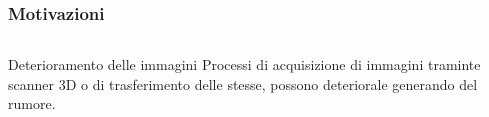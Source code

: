 \begin{frame}
  \frametitle{Motivazioni}
  \begin{columns}[t]
    \begin{column}{4cm}
       \begin{block}{Deterioramento delle immagini}
         Processi di acquisizione di immagini traminte scanner 3D o di
         trasferimento delle stesse, possono deteriorale generando del
         \alert{rumore}. 
       \end{block}
     \end{column}
     \begin{column}[T]{6cm}
     \end{column}
  \end{columns}
\end{frame}
